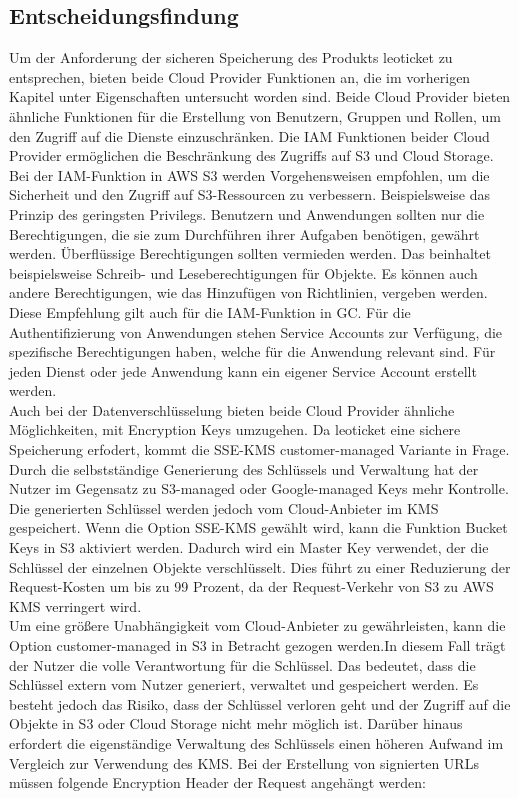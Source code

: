 \newpage

\subsection{Entscheidungsfindung} 

Um der Anforderung der sicheren Speicherung des Produkts leoticket zu entsprechen, bieten beide Cloud Provider Funktionen an, die im vorherigen Kapitel unter Eigenschaften untersucht worden sind. Beide Cloud Provider bieten ähnliche Funktionen für die Erstellung von Benutzern, Gruppen und Rollen, um den Zugriff auf die Dienste einzuschränken. Die IAM Funktionen beider Cloud Provider ermöglichen die Beschränkung des Zugriffs auf S3 und Cloud Storage. Bei der IAM-Funktion in AWS S3 werden Vorgehensweisen empfohlen, um die Sicherheit und den Zugriff auf S3-Ressourcen zu verbessern. Beispielsweise das Prinzip des geringsten Privilegs. Benutzern und Anwendungen sollten nur die Berechtigungen, die sie zum Durchführen ihrer Aufgaben benötigen, gewährt werden. Überflüssige Berechtigungen sollten vermieden werden. Das beinhaltet beispielsweise Schreib- und Leseberechtigungen für Objekte. Es können auch andere Berechtigungen, wie das Hinzufügen von Richtlinien, vergeben werden. Diese Empfehlung gilt auch für die IAM-Funktion in GC. Für die Authentifizierung von Anwendungen stehen Service Accounts zur Verfügung, die spezifische Berechtigungen haben, welche für die Anwendung relevant sind. Für jeden Dienst oder jede Anwendung kann ein eigener Service Account erstellt werden.\\

Auch bei der Datenverschlüsselung bieten beide Cloud Provider ähnliche Möglichkeiten, mit Encryption Keys umzugehen. Da leoticket eine sichere Speicherung erfodert, kommt die SSE-KMS customer-managed Variante in Frage. Durch die selbstständige Generierung des Schlüssels und Verwaltung hat der Nutzer im Gegensatz zu S3-managed oder Google-managed Keys mehr Kontrolle. Die generierten Schlüssel werden jedoch vom Cloud-Anbieter im KMS gespeichert. Wenn die Option SSE-KMS gewählt wird, kann die Funktion Bucket Keys in S3 aktiviert werden. Dadurch wird ein Master Key verwendet, der die Schlüssel der einzelnen Objekte verschlüsselt. Dies führt zu einer Reduzierung der Request-Kosten um bis zu 99 Prozent, da der Request-Verkehr von S3 zu AWS KMS verringert wird.\\

Um eine größere Unabhängigkeit vom Cloud-Anbieter zu gewährleisten, kann die Option customer-managed in S3 in Betracht gezogen werden.In diesem Fall trägt der Nutzer die volle Verantwortung für die Schlüssel. Das bedeutet, dass die Schlüssel extern vom Nutzer generiert, verwaltet und gespeichert werden. Es besteht jedoch das Risiko, dass der Schlüssel verloren geht und der Zugriff auf die Objekte in S3 oder Cloud Storage nicht mehr möglich ist. Darüber hinaus erfordert die eigenständige Verwaltung des Schlüssels einen höheren Aufwand im Vergleich zur Verwendung des KMS. Bei der Erstellung von signierten URLs müssen folgende Encryption Header der Request angehängt werden: 

